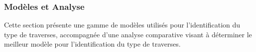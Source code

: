 \subsubsection{Modèles et Analyse}
Cette section présente une gamme de modèles utilisés pour l'identification du type de traverses, accompagnée d'une analyse comparative visant à déterminer le meilleur modèle pour l'identification du type de traverses. \\




% 


% 


% 


